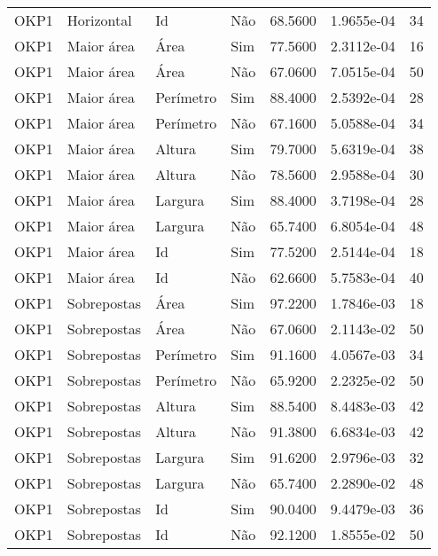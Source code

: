 \begin{tabular}{llllrrr}
OKP1      & Horizontal  & Id        & Não         & 68.5600      & 1.9655e-04 & 34       \\
OKP1      & Maior área  & Área      & Sim         & 77.5600      & 2.3112e-04 & 16       \\
OKP1      & Maior área  & Área      & Não         & 67.0600      & 7.0515e-04 & 50       \\
OKP1      & Maior área  & Perímetro & Sim         & 88.4000      & 2.5392e-04 & 28       \\
OKP1      & Maior área  & Perímetro & Não         & 67.1600      & 5.0588e-04 & 34       \\
OKP1      & Maior área  & Altura    & Sim         & 79.7000      & 5.6319e-04 & 38       \\
OKP1      & Maior área  & Altura    & Não         & 78.5600      & 2.9588e-04 & 30       \\
OKP1      & Maior área  & Largura   & Sim         & 88.4000      & 3.7198e-04 & 28       \\
OKP1      & Maior área  & Largura   & Não         & 65.7400      & 6.8054e-04 & 48       \\
OKP1      & Maior área  & Id        & Sim         & 77.5200      & 2.5144e-04 & 18       \\
OKP1      & Maior área  & Id        & Não         & 62.6600      & 5.7583e-04 & 40       \\
OKP1      & Sobrepostas & Área      & Sim         & 97.2200      & 1.7846e-03 & 18       \\
OKP1      & Sobrepostas & Área      & Não         & 67.0600      & 2.1143e-02 & 50       \\
OKP1      & Sobrepostas & Perímetro & Sim         & 91.1600      & 4.0567e-03 & 34       \\
OKP1      & Sobrepostas & Perímetro & Não         & 65.9200      & 2.2325e-02 & 50       \\
OKP1      & Sobrepostas & Altura    & Sim         & 88.5400      & 8.4483e-03 & 42       \\
OKP1      & Sobrepostas & Altura    & Não         & 91.3800      & 6.6834e-03 & 42       \\
OKP1      & Sobrepostas & Largura   & Sim         & 91.6200      & 2.9796e-03 & 32       \\
OKP1      & Sobrepostas & Largura   & Não         & 65.7400      & 2.2890e-02 & 48       \\
OKP1      & Sobrepostas & Id        & Sim         & 90.0400      & 9.4479e-03 & 36       \\
OKP1      & Sobrepostas & Id        & Não         & 92.1200      & 1.8555e-02 & 50       \\
\hline
\end{tabular}